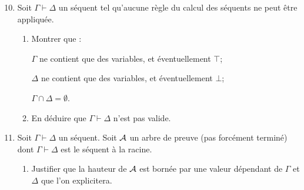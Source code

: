 \documentclass[a4paper,french,bookmarks]{article}
\begin{document}
    \begin{enumerate}
        \setcounter{enumi}{9}
            
        \item Soit $\Gamma \vdash \Delta$ un séquent tel qu'aucune règle du calcul des séquents ne peut être appliquée.
        
        \begin{enumerate}
            \item Montrer que :
            \begin{enumerate}
                \itast $\Gamma$ ne contient que des variables, et éventuellement $\top$;
                
                \itast $\Delta$ ne contient que des variables, et éventuellement $\bot$;
                
                \itast $\Gamma \cap \Delta = \emptyset$.
            \end{enumerate}
            
            
            \item En déduire que $\Gamma \vdash \Delta$ n'est pas valide.
            
        \end{enumerate}
        
        \item Soit $\Gamma \vdash \Delta$ un séquent. Soit $\mathcal{A}$ un arbre de preuve (pas forcément terminé) dont $\Gamma \vdash \Delta$ est le séquent à la racine.
        
        \begin{enumerate}
            \item Justifier que la hauteur de $\mathcal{A}$ est bornée par une valeur dépendant de $\Gamma$ et $\Delta$ que l'on explicitera.
            

\end{enumerate}
\end{enumerate}
\end{document}

